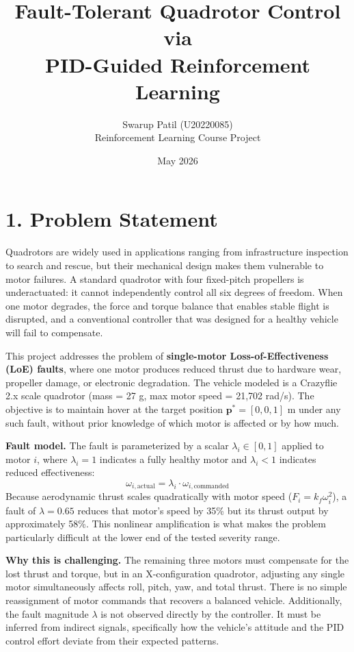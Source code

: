 \documentclass[12pt,letterpaper]{article}
\title{\textbf{Fault-Tolerant Quadrotor Control via\\PID-Guided Reinforcement Learning}}
\author{Swarup Patil (U20220085)\\[4pt]\small Reinforcement Learning Course Project}
\date{May 2026}
\begin{document}
\maketitle
\thispagestyle{empty}

\section*{1. Problem Statement}

Quadrotors are widely used in applications ranging from infrastructure inspection to search and rescue, but their mechanical design makes them vulnerable to motor failures. A standard quadrotor with four fixed-pitch propellers is underactuated: it cannot independently control all six degrees of freedom. When one motor degrades, the force and torque balance that enables stable flight is disrupted, and a conventional controller that was designed for a healthy vehicle will fail to compensate.

This project addresses the problem of \textbf{single-motor Loss-of-Effectiveness (LoE) faults}, where one motor produces reduced thrust due to hardware wear, propeller damage, or electronic degradation. The vehicle modeled is a Crazyflie 2.x scale quadrotor (mass = 27 g, max motor speed = 21,702 rad/s). The objective is to maintain hover at the target position $\mathbf{p}^* = [0, 0, 1]$ m under any such fault, without prior knowledge of which motor is affected or by how much.

\textbf{Fault model.} The fault is parameterized by a scalar $\lambda_i \in [0, 1]$ applied to motor $i$, where $\lambda_i = 1$ indicates a fully healthy motor and $\lambda_i < 1$ indicates reduced effectiveness:
\begin{equation}
    \omega_{i,\text{actual}} = \lambda_i \cdot \omega_{i,\text{commanded}}
\end{equation}
Because aerodynamic thrust scales quadratically with motor speed ($F_i = k_f \omega_i^2$), a fault of $\lambda = 0.65$ reduces that motor's speed by 35\% but its thrust output by approximately 58\%. This nonlinear amplification is what makes the problem particularly difficult at the lower end of the tested severity range.

\textbf{Why this is challenging.} The remaining three motors must compensate for the lost thrust and torque, but in an X-configuration quadrotor, adjusting any single motor simultaneously affects roll, pitch, yaw, and total thrust. There is no simple reassignment of motor commands that recovers a balanced vehicle. Additionally, the fault magnitude $\lambda$ is not observed directly by the controller. It must be inferred from indirect signals, specifically how the vehicle's attitude and the PID control effort deviate from their expected patterns.
\end{document}
